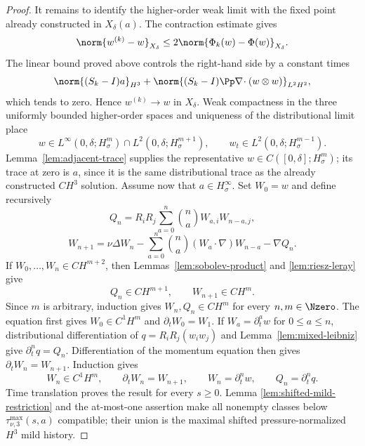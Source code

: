 \begin{proof}
It remains to identify the higher-order weak limit with the fixed point already
constructed in \(X_\delta(a)\).  The contraction estimate gives
\[
 \norm{w^{(k)}-w}_{X_\delta}
 \le2\norm{\Phi_k(w)-\Phi(w)}_{X_\delta}.
\]
The linear bound proved above controls the right-hand side by a constant times
\[
 \norm{(S_k-I)a}_{H^3}
 +\norm{(S_k-I)\Pp\nabla\!\cdot(w\otimes w)}_{L^2H^2},
\]
which tends to zero.  Hence \(w^{(k)}\to w\) in \(X_\delta\).  Weak
compactness in the three uniformly bounded higher-order spaces and uniqueness
of the distributional limit place
\[
 w\in L^\infty(0,\delta;H^m_\sigma)\cap L^2(0,\delta;H^{m+1}_\sigma),
 \qquad w_t\in L^2(0,\delta;H^{m-1}_\sigma).
\]
Lemma~\ref{lem:adjacent-trace} supplies the representative
\(w\in C([0,\delta];H^m_\sigma)\); its trace at zero is \(a\), since it is
the same distributional trace as the already constructed \(C H^3\) solution.
Assume now that \(a\in H^\infty_\sigma\).  Set \(W_0=w\) and define
recursively
\[
 Q_n=R_iR_j\sum_{a=0}^n\binom naW_{a,i}W_{n-a,j},
\]
\[
 W_{n+1}=\nu\Delta W_n
 -\sum_{a=0}^n\binom na(W_a\cdot\nabla)W_{n-a}-\nabla Q_n.
\]
If \(W_0,\ldots,W_n\in C H^{m+2}\), then
Lemmas~\ref{lem:sobolev-product} and \ref{lem:riesz-leray} give
\[
 Q_n\in C H^{m+1},
 \qquad
 W_{n+1}\in C H^m.
\]
Since \(m\) is arbitrary, induction gives \(W_n,Q_n\in C H^m\) for every
\(n,m\in\Nzero\).  The equation first gives
\(W_0\in C^1H^m\) and \(\partial_tW_0=W_1\).  If
\(W_a=\partial_t^aw\) for \(0\le a\le n\), distributional differentiation
of \(q=R_iR_j(w_iw_j)\) and Lemma~\ref{lem:mixed-leibniz} give
\(\partial_t^nq=Q_n\).  Differentiation of the momentum equation then gives
\(\partial_tW_n=W_{n+1}\).  Induction gives
\[
 W_n\in C^1H^m,
 \qquad
 \partial_tW_n=W_{n+1},
 \qquad
 W_n=\partial_t^nw,
 \qquad
 Q_n=\partial_t^nq.
\]
Time translation proves the result for every \(s\ge0\).  Lemma
\ref{lem:shifted-mild-restriction} and the at-most-one assertion make all
nonempty classes below \(\tau_{\nu,3}^{\max}(s,a)\) compatible; their union
is the maximal shifted pressure-normalized \(H^3\) mild history.
\end{proof}
